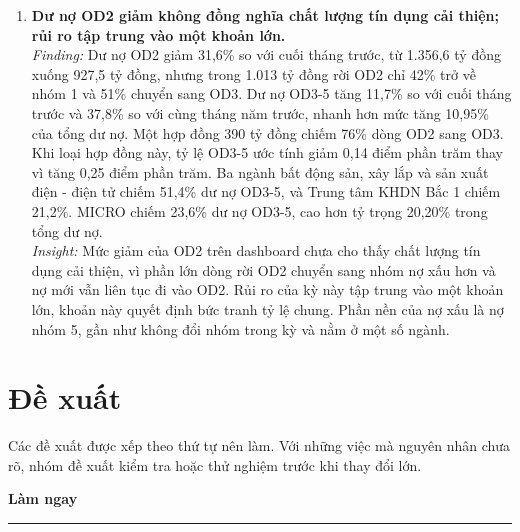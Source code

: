 \documentclass[12pt]{eDA_conquer2026}
\begin{document}
\begin{enumerate}[label=\textbf{\arabic*.}, leftmargin=0.8cm]
\item \textbf{Dư nợ OD2 giảm không đồng nghĩa chất lượng tín dụng cải thiện; rủi ro tập trung vào một khoản lớn.}\\
    \textit{Finding:} Dư nợ OD2 giảm 31,6\% so với cuối tháng trước, từ 1.356,6 tỷ đồng xuống 927,5 tỷ đồng, nhưng trong 1.013 tỷ đồng rời OD2 chỉ 42\% trở về nhóm 1 và 51\% chuyển sang OD3. Dư nợ OD3-5 tăng 11,7\% so với cuối tháng trước và 37,8\% so với cùng tháng năm trước, nhanh hơn mức tăng 10,95\% của tổng dư nợ. Một hợp đồng 390 tỷ đồng chiếm 76\% dòng OD2 sang OD3. Khi loại hợp đồng này, tỷ lệ OD3-5 ước tính giảm 0,14 điểm phần trăm thay vì tăng 0,25 điểm phần trăm. Ba ngành bất động sản, xây lắp và sản xuất điện - điện tử chiếm 51,4\% dư nợ OD3-5, và Trung tâm KHDN Bắc 1 chiếm 21,2\%. MICRO chiếm 23,6\% dư nợ OD3-5, cao hơn tỷ trọng 20,20\% trong tổng dư nợ.\\
    \textit{Insight:} Mức giảm của OD2 trên dashboard chưa cho thấy chất lượng tín dụng cải thiện, vì phần lớn dòng rời OD2 chuyển sang nhóm nợ xấu hơn và nợ mới vẫn liên tục đi vào OD2. Rủi ro của kỳ này tập trung vào một khoản lớn, khoản này quyết định bức tranh tỷ lệ chung. Phần nền của nợ xấu là nợ nhóm 5, gần như không đổi nhóm trong kỳ và nằm ở một số ngành.

\end{enumerate}

\section{Đề xuất}

Các đề xuất được xếp theo thứ tự nên làm. Với những việc mà nguyên nhân chưa rõ, nhóm đề xuất kiểm tra hoặc thử nghiệm trước khi thay đổi lớn.

\vspace{0.3cm}
\textbf{Làm ngay}
\vspace{0.1cm}
\hrule
\vspace{0.3cm}
\end{document}
